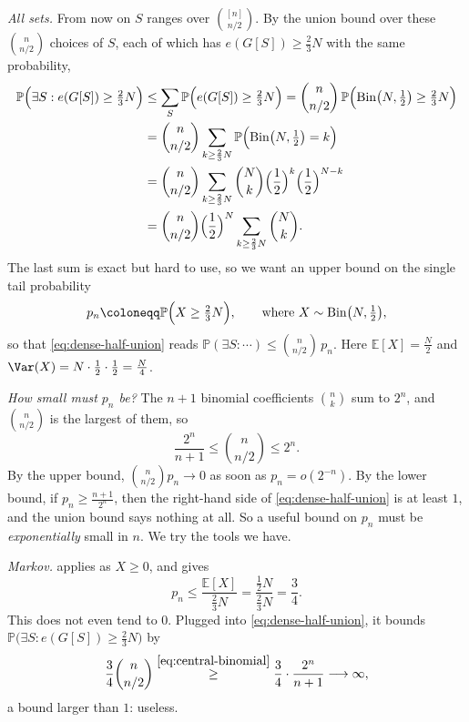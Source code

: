 \emph{All sets.} From now on \(S\) ranges over \(\binom{[n]}{n/2}\). By the union bound over these \(\binom{n}{n/2}\) choices of \(S\), each of which has \(e(G[S]) \ge \frac{2}{3} N\) with the same probability,
\begin{align}
    \mathbb{P}\Bigl( \exists S : e(G[S]) \ge \tfrac{2}{3} N \Bigr)
    &\le \sum_{S} \mathbb{P}\Bigl( e(G[S]) \ge \tfrac{2}{3} N \Bigr)
    = \binom{n}{n/2} \, \mathbb{P}\Bigl( \operatorname{Bin}\bigl( N, \tfrac{1}{2} \bigr) \ge \tfrac{2}{3} N \Bigr) \label{eq:dense-half-union} \\
    &= \binom{n}{n/2} \sum_{k \ge \frac{2}{3} N} \mathbb{P}\Bigl( \operatorname{Bin}\bigl( N, \tfrac{1}{2} \bigr) = k \Bigr) \notag \\
    &= \binom{n}{n/2} \sum_{k \ge \frac{2}{3} N} \binom{N}{k} \Bigl( \frac{1}{2} \Bigr)^{k} \Bigl( \frac{1}{2} \Bigr)^{N-k} \notag \\
    &= \binom{n}{n/2} \Bigl( \frac{1}{2} \Bigr)^{N} \sum_{k \ge \frac{2}{3} N} \binom{N}{k} . \notag
\end{align}
The last sum is exact but hard to use, so we want an upper bound on the single tail probability
\[
    p_{n} \coloneqq \mathbb{P}\Bigl( X \ge \tfrac{2}{3} N \Bigr), \qquad \text{where } X \sim \operatorname{Bin}\bigl( N, \tfrac{1}{2} \bigr) ,
\]
so that \eqref{eq:dense-half-union} reads \(\mathbb{P}(\exists S : \cdots) \le \binom{n}{n/2} \, p_{n}\). Here \(\mathbb{E}[X] = \frac{N}{2}\) and \(\Var(X) = N \cdot \frac{1}{2} \cdot \frac{1}{2} = \frac{N}{4}\).

\emph{How small must \(p_{n}\) be?} The \(n+1\) binomial coefficients \(\binom{n}{k}\) sum to \(2^{n}\), and \(\binom{n}{n/2}\) is the largest of them, so
\begin{equation}\label{eq:central-binomial}
    \frac{2^{n}}{n+1} \le \binom{n}{n/2} \le 2^{n} .
\end{equation}
By the upper bound, \(\binom{n}{n/2} p_{n} \to 0\) as soon as \(p_{n} = o(2^{-n})\). By the lower bound, if \(p_{n} \ge \frac{n+1}{2^{n}}\), then the right-hand side of \eqref{eq:dense-half-union} is at least \(1\), and the union bound says nothing at all. So a useful bound on \(p_{n}\) must be \emph{exponentially} small in \(n\). We try the tools we have.

\emph{Markov.}  applies as \(X \ge 0\), and gives
\[
    p_{n} \le \frac{\mathbb{E}[X]}{\frac{2}{3} N} = \frac{\frac{1}{2} N}{\frac{2}{3} N} = \frac{3}{4} .
\]
This does not even tend to \(0\). Plugged into \eqref{eq:dense-half-union}, it bounds \(\mathbb{P}\bigl( \exists S : e(G[S]) \ge \tfrac{2}{3} N \bigr)\) by
\[
    \frac{3}{4} \binom{n}{n/2} \overset{\eqref{eq:central-binomial}}{\ge} \frac{3}{4} \cdot \frac{2^{n}}{n+1} \longrightarrow \infty ,
\]
a bound larger than \(1\): useless.

